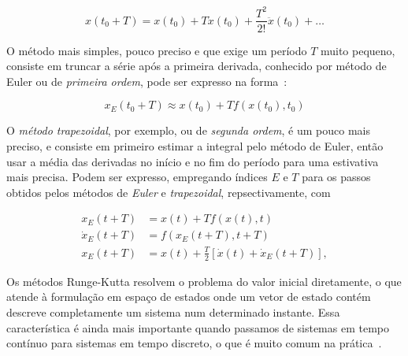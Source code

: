 \begin{equation*}\tag{3.4-3}
    x \left(t_{0} + T \right) = x \left(t_{0}\right) + T \dot{x}\left(t_{0}\right) + \frac{T^{2}}{2!} \ddot{x}\left(t_{0}\right) + \ldots
\end{equation*}

O método mais simples, pouco preciso e que exige um período \(T\) muito pequeno, consiste em truncar a série após a primeira derivada, conhecido por método de Euler ou de \emph{primeira ordem},  pode ser expresso na forma~\cite{Stevens2016}:

\begin{equation*}\tag{3.4-4}
    x_{E}\left(t_{0} + T \right) \approx x \left( t_{0} \right) + T f\left(x\left(t_{0}\right), t_{0}\right)
\end{equation*}

O \emph{método trapezoidal}, por exemplo, ou de \emph{segunda ordem}, é um pouco mais preciso, e consiste em primeiro estimar a integral pelo método de Euler, então usar a média das derivadas no início e no fim do período para uma estivativa mais precisa. Podem ser expresso, empregando índices \(E\) e \(T\) para os passos obtidos pelos métodos de \emph{Euler} e \emph{trapezoidal}, repsectivamente,  com~\cite{Stevens2016}

\begin{align*}\tag{3.4-5}
    x_{E}\left(t + T\right) &= x\left(t\right) + T f\left(x\left(t\right),t\right) \\
    \dot{x}_{E}\left(t + T\right) &= {f{\left( x_{E} {\left( t + T \right)}, t+T \right)}} \\
    x_{E}\left(t + T\right) &= x\left(t\right) + \frac{T}{2} \left[ \dot{x}\left(t\right) + \dot{x}_{E}\left(t + T\right) \right],
\end{align*}

Os métodos Runge-Kutta\footnotemark{} resolvem o problema do valor inicial diretamente, o que atende à formulação em espaço de estados onde um vetor de estado contém descreve completamente um sistema num determinado instante. Essa característica é ainda mais importante quando passamos de sistemas em tempo contínuo para sistemas em tempo discreto, o que é muito comum na prática~\cite{Stevens2016}.

